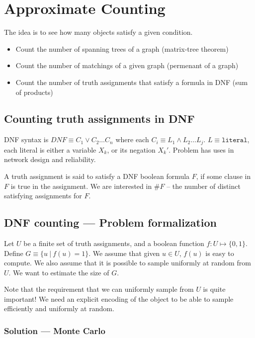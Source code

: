\chapter{Approximate Counting}

The idea is to see how many objects satisfy a given condition.


\begin{itemize}
    \item Count the number of spanning trees of a graph (matrix-tree theorem)
    \item Count the number of matchings of a given graph (permenant of a graph)
    \item Count the number of truth assignments that satisfy a formula in DNF
        (sum of products)
\end{itemize}

\section{Counting truth assignments in DNF}

DNF syntax is $DNF \equiv C_1 \lor C_2 \dots C_n$ where each $C_i \equiv L_1 \land L_2 \dots L_j$.
$L \equiv \texttt{literal}$, each literal is either a variable $X_k$, or its
negation $X_k'$.
Problem has uses in network design and reliability.

A truth assignment is said to satisfy a DNF boolean formula $F$, if some clause in $F$
is true in the assignment. We are interested in $\#F$ -- the number of distinct
satisfying assignments for $F$.

\section{DNF counting --- Problem formalization}

Let $U$ be a finite set of truth assignments, and a boolean function $f: U \mapsto \{0, 1\}$.
Define $G \equiv \{ u~\vert~f(u) = 1\}$.
We assume that given $u \in U$, $f(u)$ is easy to compute.
We also assume that it is possible to sample uniformly at random from $U$.
We want to estimate the size of $G$.

Note that the requirement that we can uniformly sample from $U$ is
quite important! We need an explicit encoding of the object to be able
to sample efficiently and uniformly at random.

\subsection{Solution --- Monte Carlo}


